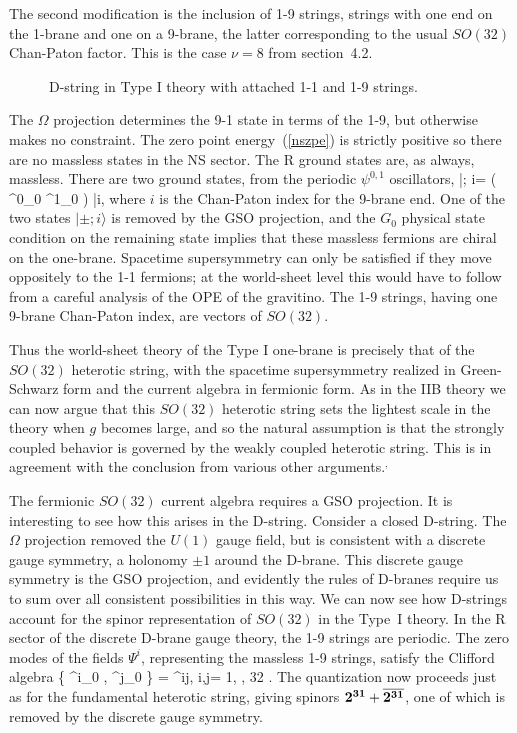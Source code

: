 The second modification is the inclusion of 1-9 strings, strings with
one end on the 1-brane and one on a 9-brane, the latter corresponding
to the usual $SO(32)$ Chan-Paton factor.  This is the case $\nu = 8$ from
section~4.2.
\begin{figure}
\begin{center}
\leavevmode
{}
\end{center}
\caption[]{D-string in Type I theory with attached 1-1 and 1-9 strings.}
\end{figure}
The $\Omega$
projection determines the 9-1 state in terms of the 1-9, but
otherwise makes no constraint.  The zero point energy~(\ref{nszpe}) is
strictly positive so there are no massless states in the NS
sector.  The R ground states are, as always, massless.  There are two ground
states, from the periodic
$\psi^{0,1}$ oscillators, 
\be
|\pm; i\rangle = ( \psi^0_0 \pm \psi^1_0 ) |i\rangle,
\ee 
where $i$ is the Chan-Paton index for the 9-brane end.  One of the two
states
$|\pm; i\rangle$ is removed by the GSO projection, and the $G_0$ physical
state condition on the remaining state implies that these massless fermions
are chiral on the one-brane.  Spacetime supersymmetry can only be
satisfied if they move oppositely to the 1-1 fermions; at the world-sheet
level this would have to follow from a careful analysis of the OPE of the
gravitino. The 1-9 strings, having one 9-brane
Chan-Paton index, are vectors of $SO(32)$.

Thus the world-sheet theory of the Type I one-brane is precisely that of
the $SO(32)$ heterotic string, 
with the spacetime supersymmetry realized in Green-Schwarz form and the
current algebra in fermionic form.\cite{polwit}  As in the IIB theory we can
now argue that this $SO(32)$ heterotic string sets the lightest scale in the
theory when $g$ becomes large, and so the natural assumption is that the
strongly coupled behavior is governed by the weakly coupled heterotic
string.  This is in agreement with the conclusion from various other
arguments.\cite{wit}$^{\!,\,}$\cite{blackone}

The fermionic $SO(32)$ current algebra requires a GSO projection.  It is
interesting to see how this arises in the D-string.  Consider a closed
D-string.  The $\Omega$ projection removed the $U(1)$ gauge field, but is
consistent with a discrete gauge symmetry, a holonomy $\pm 1$ around the
D-brane.  This discrete gauge symmetry is the GSO projection, and evidently
the rules of D-branes require us to sum over all consistent possibilities in
this way.
We can now see how D-strings account for the spinor
representation of $SO(32)$ in the Type~I theory.  In the {R} sector of
the discrete D-brane gauge theory, the
1-9 strings are periodic.  The zero modes of the fields $\Psi^i$,
representing the massless
1-9 strings, satisfy the Clifford algebra
\be
\{ \Psi^i_0 , \Psi^j_0 \} = \delta^{ij}, \qquad i,j= 1,
\cdots , 32 .
\ee
The quantization now proceeds just as for the fundamental heterotic string,
giving spinors ${\bf 2^{31}} + \overline{\bf  2^{31}}$, one of which is
removed by the discrete gauge symmetry.

